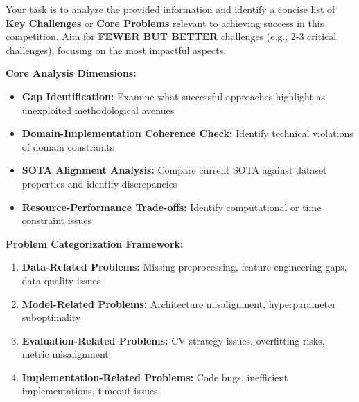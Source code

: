 \begin{tcolorbox}[
  colback=gray!5,
  colframe=gray!80,
  title=Systematic Problem Identification –--- Reasoning Pipeline Component,
  breakable
]
Your task is to analyze the provided information and identify a concise list of \textbf{Key Challenges} or \textbf{Core Problems} relevant to achieving success in this competition. Aim for \textbf{FEWER BUT BETTER} challenges (e.g., 2-3 critical challenges), focusing on the most impactful aspects.

\textbf{Core Analysis Dimensions:}
\begin{itemize}
    \item \textbf{Gap Identification:} Examine what successful approaches highlight as unexploited methodological avenues
    \item \textbf{Domain-Implementation Coherence Check:} Identify technical violations of domain constraints
    \item \textbf{SOTA Alignment Analysis:} Compare current SOTA against dataset properties and identify discrepancies
    \item \textbf{Resource-Performance Trade-offs:} Identify computational or time constraint issues
\end{itemize}

\textbf{Problem Categorization Framework:}
\begin{enumerate}
    \item \textbf{Data-Related Problems:} Missing preprocessing, feature engineering gaps, data quality issues
    \item \textbf{Model-Related Problems:} Architecture misalignment, hyperparameter suboptimality
    \item \textbf{Evaluation-Related Problems:} CV strategy issues, overfitting risks, metric misalignment
    \item \textbf{Implementation-Related Problems:} Code bugs, inefficient implementations, timeout issues
\end{enumerate}
\end{tcolorbox}

